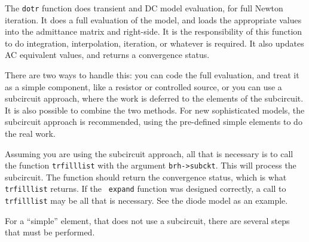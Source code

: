 The {\tt dotr} function does transient and DC model evaluation, for full
Newton iteration.  It does a full evaluation of the model, and loads the
appropriate values into the admittance matrix and right-side.  It is the
responsibility of this function to do integration, interpolation, iteration,
or whatever is required.  It also updates AC equivalent values, and returns
a convergence status.

There are two ways to handle this: you can code the full evaluation, and
treat it as a simple component, like a resistor or controlled source, or you
can use a subcircuit approach, where the work is deferred to the elements of
the subcircuit.  It is also possible to combine the two methods.  For new
sophisticated models, the subcircuit approach is recommended, using the
pre-defined simple elements to do the real work.

Assuming you are using the subcircuit approach, all that is necessary is to
call the function {\tt trfilllist} with the argument {\tt brh->subckt}.
This will process the subcircuit.  The function should return the
convergence status, which is what {\tt trfilllist} returns.  If the {\tt
expand} function was designed correctly, a call to {\tt trfilllist} may be
all that is necessary.  See the diode model as an example.

For a ``simple'' element, that does not use a subcircuit, there are several
steps that must be performed.

